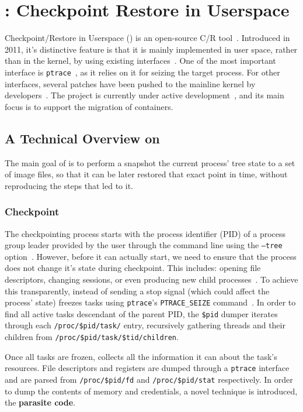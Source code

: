 \section{\criu: Checkpoint Restore in Userspace}

Checkpoint/Restore in Userspace (\criu) is an open-source C/R tool~\cite{criu-main-page}.
Introduced in 2011, it's distinctive feature is that it is mainly implemented in user space, rather than in the kernel, by using existing interfaces~\cite{Reber2016}.
One of the most important interface is \texttt{ptrace}~\cite{ptrace-manpage}, as it relies on it for seizing the target process.
For other interfaces, several patches have been pushed to the mainline kernel by \criu developers~\cite{criu-kernel-patches}.
The project is currently under active development~\cite{criu-github}, and its main focus is to support the migration of containers.

\subsection{A Technical Overview on \criu}

The main goal of \criu is to perform a snapshot the current process' tree state to a set of image files, so that it can be later restored that exact point in time, without reproducing the steps that led to it.

\subsubsection*{Checkpoint}

The checkpointing process starts with the process identifier (PID) of a process group leader provided by the user through the command line using the \texttt{--tree} option~\cite{criu-checkpoint}.
However, before it can actually start, we need to ensure that the process does not change it's state during checkpoint.
This includes: opening file descriptors, changing sessions, or even producing new child processes~\cite{criu-freeze}.
To achieve this transparently, instead of sending a stop signal (which could affect the process' state) \criu freezes tasks using \texttt{ptrace}'s \texttt{PTRACE\_SEIZE} command~\cite{ptrace-manpage}.
In order to find all active tasks descendant of the parent PID, the \texttt{\$pid} dumper iterates through each \texttt{/proc/\$pid/task/} entry, recursively gathering threads and their children from \texttt{/proc/\$pid/task/\$tid/children}.

Once all tasks are frozen, \criu collects all the information it can about the task's resources.
File descriptors and registers are dumped through a \texttt{ptrace} interface and are parsed from \texttt{/proc/\$pid/fd} and \texttt{/proc/\$pid/stat} respectively.
In order to dump the contents of memory and credentials, a novel technique is introduced, the \textbf{parasite code}.

